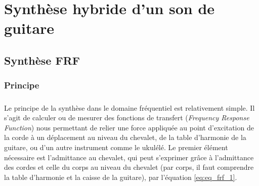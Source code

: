 % 
% 
% 
% 
% 
% 
% 
% 
% 
% 
% 

\chapter{Synthèse hybride d'un son de guitare}

\section{Synthèse FRF}

\subsection{Principe}
\paragraph*{} 

Le principe de la synthèse dans le domaine fréquentiel est relativement simple.
Il s'agit de calculer ou de mesurer des fonctions de transfert
(\textit{Frequency Response Function}) nous permettant de relier une force
appliquée au point d'excitation de la corde à un déplacement au niveau du
chevalet, de la table d'harmonie de la guitare, ou d'un autre instrument comme
le ukulélé. Le premier élément nécessaire est l'admittance au chevalet, qui
peut s'exprimer grâce à l'admittance des cordes et celle du corps au niveau du
chevalet (par corps, il faut comprendre la table d'harmonie et la caisse de la
guitare), par l'équation \ref{eq:eq_frf_1}.

